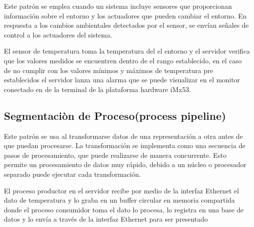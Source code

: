 Este patrón se emplea cuando un sistema incluye sensores que proporcionan información sobre el entorno y los actuadores que pueden cambiar el entorno. En respuesta a los cambios ambientales detectados por el sensor, se envían señales de control a los actuadores del sistema.

El sensor de temperatura toma la temperatura del el entorno y el servidor verifica que los valores medidos se encuentren dentro de el rango establecido, en el caso de no cumplir con los valores mínimos y máximos de temperatura pre establecidos el servidor lanza una alarma que se puede visualizar en el monitor conectado en de la terminal de la plataforma hardware iMx53.

 
\subsection{\textcolor[gray]{.2}{Segmentaciòn de Proceso(process pipeline)}}

Este patrón se usa al transformarse datos de una representación a otra antes de que puedan procesarse. La transformación se implementa como una secuencia de pasos de procesamiento, que puede realizarse de manera concurrente. Esto permite un procesamiento de datos muy rápido, debido a un núcleo o procesador separado puede ejecutar cada transformación.

El proceso productor en el servidor recibe por medio de la interfaz Ethernet el dato de temperatura y lo graba en un buffer circular en memoria compartida donde el proceso consumidor toma el dato lo procesa, lo registra en una base de datos y lo envía a través de la interfaz Ethernet para ser presentado

